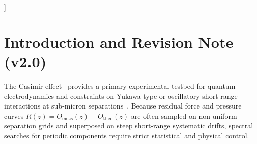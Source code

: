 \documentclass[10pt,twocolumn,a4paper]{article}
\begin{document}
{\begin{@twocolumnfalse}
\begin{abstract}
    \end{abstract}
    \vspace{0.5cm}
  \end{@twocolumnfalse}
}]

\section{Introduction and Revision Note (v2.0)}
The Casimir effect~\cite{casimir1948,lifshitz1956} provides a primary experimental testbed for quantum electrodynamics and constraints on Yukawa-type or oscillatory short-range interactions at sub-micron separations~\cite{decca2003,lamoreaux1997,bressi2002,klimchitskaya2009,dejong2025}. Because residual force and pressure curves $R(z) = O_{\mathrm{meas}}(z) - O_{\mathrm{theo}}(z)$ are often sampled on non-uniform separation grids and superposed on steep short-range systematic drifts, spectral searches for periodic components require strict statistical and physical control.
\end{document}
